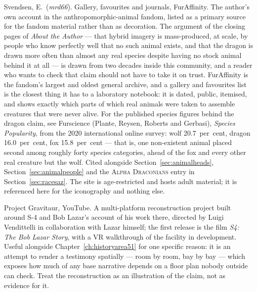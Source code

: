 \begin{list}{}{\setlength{\leftmargin}{1.2em}\setlength{\itemindent}{-1.2em}
\setlength{\itemsep}{3pt}}
\item Svendsen, E.\ (\emph{mrd66}). Gallery, favourites and journals, FurAffinity. The author's own
account in the anthropomorphic-animal fandom, listed as a primary source for the fandom material
rather than as decoration. The argument of the closing pages of \emph{About the Author} --- that
hybrid imagery is mass-produced, at scale, by people who know perfectly well that no such animal
exists, and that the dragon is drawn more often than almost any real species despite having no stock
animal behind it at all --- is drawn from two decades inside this community, and a reader who
wants to check that claim should not have to take it on trust. FurAffinity is the fandom's largest
and oldest general archive, and a gallery and favourites list is the closest thing it has to a
laboratory notebook: it is dated, public, itemised, and shows exactly which parts of which real
animals were taken to assemble creatures that were never alive. For the published species figures
behind the dragon claim, see Furscience (Plante, Reysen, Roberts and Gerbasi), \emph{Species
Popularity}, from the 2020 international online survey: wolf 20.7~per~cent, dragon 16.0~per~cent,
fox 15.8~per~cent --- that is, one non-existent animal placed second among roughly forty species
categories, ahead of the fox and every other real creature but the wolf.
Cited alongside
Section~\ref{sec:animalheads}, Section~\ref{sec:animalpeople} and the
\textsc{Alpha Draconians} entry in Section~\ref{sec:racesaz}. The site is age-restricted and
hosts adult material; it is referenced here for the iconography and nothing else.
\item Project Gravitaur, YouTube. A multi-platform reconstruction project built around S-4 and
Bob Lazar's account of his work there, directed by Luigi Vendittelli in collaboration with Lazar
himself; the first release is the film \emph{S4: The Bob Lazar Story}, with a VR walkthrough of
the facility in development. Useful alongside Chapter~\ref{ch:historyarea51} for one specific
reason: it is an attempt to render a testimony spatially --- room by room, bay by bay --- which
exposes how much of any base narrative depends on a floor plan nobody outside can check. Treat the
reconstruction as an illustration of the claim, not as evidence for it.

\end{list}
